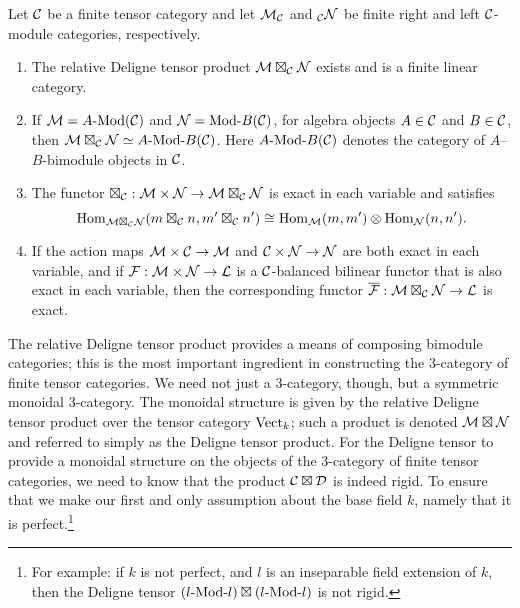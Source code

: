 \documentclass{amsart}
\begin{document}
\begin{theorem} \label{thm:DelignePrdtOverATCExists}
	Let $\mathcal C$ be a finite tensor category and let $\mathcal M_{\mathcal C}$ and ${}_{\mathcal C}\mathcal N$ be finite right and left $\mathcal C$-module categories, respectively. 
	\begin{enumerate}
		\item The relative Deligne tensor product $\mathcal M \boxtimes_{\mathcal C} \mathcal N$ exists and is a finite linear category.
		\item If $\cM = \Mod{A}{}(\cC)$ and $\cN = \Mod{}{B}(\cC)$, for algebra objects $A \in \mathcal C$ and $B \in \mathcal C$, then $\cM \boxtimes_{\cC} \cN \simeq \Mod{A }{B}(\cC)$. Here $\Mod{A}{B}(\cC)$ denotes the category of $A$--$B$-bimodule objects in $\mathcal C$.

		\item The functor $\boxtimes_{\mathcal C}: \mathcal M \times \mathcal N \rightarrow \mathcal M \boxtimes_\mathcal C \mathcal N$ is exact in each variable and satisfies 
		\begin{equation*}
			\operatorname{Hom}_{\mathcal M \boxtimes_{\mathcal C} \mathcal N} (m \boxtimes_\mathcal C n, m' \boxtimes_\mathcal C n') \cong \operatorname{Hom}_{\mathcal M}(m,m') \otimes \operatorname{Hom}_{\mathcal N}(n, n').
		\end{equation*}
		\item If the action maps $\mathcal M \times \mathcal C \rightarrow \mathcal M$ and $\mathcal C \times \mathcal N \rightarrow \mathcal N$ are both exact in each variable, and if $\mathcal F: \mathcal M \times \mathcal N \to \mathcal L$ is a $\mathcal C$-balanced bilinear functor that is also exact in each variable, then the corresponding functor $\overline{\mathcal F}: \mathcal M \boxtimes_{\mathcal C} \mathcal N \to \mathcal L$ is exact. 
	\end{enumerate} 	
\end{theorem} %

The relative Deligne tensor product provides a means of composing bimodule categories; this is the most important ingredient in constructing the 3-category of finite tensor categories.  We need not just a 3-category, though, but a symmetric monoidal 3-category.  The monoidal structure is given by the relative Deligne tensor product over the tensor category $\mathrm{Vect}_k$; such a product is denoted $\mathcal M \boxtimes \mathcal N$ and referred to simply as the Deligne tensor product.  For the Deligne tensor to provide a monoidal structure on the objects of the 3-category of finite tensor categories, we need to know that the product $\mathcal C \boxtimes \mathcal D$ is indeed rigid.  To ensure that we make our first and only assumption about the base field $k$, namely that it is perfect.\footnote{For example: if $k$ is not perfect, and $l$ is an inseparable field extension of $k$, then the Deligne tensor $(\Mod{l}{l}) \boxtimes (\Mod{l}{l})$ is not rigid.} %
\end{document}
